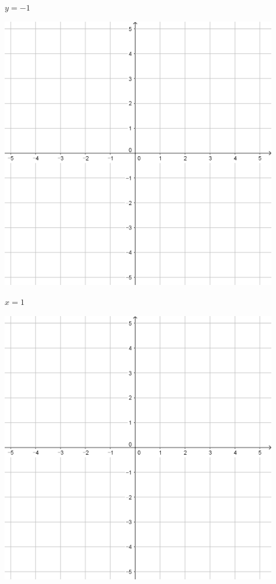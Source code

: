 \documentclass{oblivoir}
\begin{document}
\begin{minipage}{0.45\textwidth}\centering
\(y=-1\)
\par\bigskip\includegraphics[width=0.9\textwidth]{55}
\end{minipage}
\begin{minipage}{0.45\textwidth}\centering
\(x=1\)
\par\bigskip\includegraphics[width=0.9\textwidth]{55}
\end{minipage}\bigskip\bigskip\par
\end{document}
